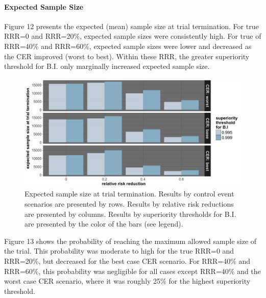 \documentclass[]{article}
\let\oldparagraph\paragraph
\renewcommand{\paragraph}[1]{\oldparagraph{#1}\mbox{}}
\begin{document}
\hypertarget{expected-sample-size-1}{%
\paragraph{Expected Sample Size}\label{expected-sample-size-1}}

Figure 12 presents the expected (mean) sample size at trial termination.
For true RRR=0 and RRR=20\%, expected sample sizes were consistently
high. For true of RRR=40\% and RRR=60\%, expected sample sizes were
lower and decreased as the CER improved (worst to best). Within these
RRR, the greater superiority threshold for B.I. only marginally
increased expected sample size.

\begin{figure}
  \caption{Expected sample size at trial termination. Results by control event scenarios are presented by rows. Results
  by relative risk reductions are presented by columns. Results by superiority thresholds for B.I. are presented by the
  color of the bars (see legend).}
  \includegraphics{../plots/3arm/ESS_3arm.png}
\end{figure}

Figure 13 shows the probability of reaching the maximum allowed sample
size of the trial. This probability was moderate to high for the true
RRR=0 and RRR=20\%, but decreased for the best case CER scenario. For
RRR=40\% and RRR=60\%, this probability was negligible for all cases
except RRR=40\% and the worst case CER scenario, where it was roughly
25\% for the highest superiority threshold.
\end{document}
